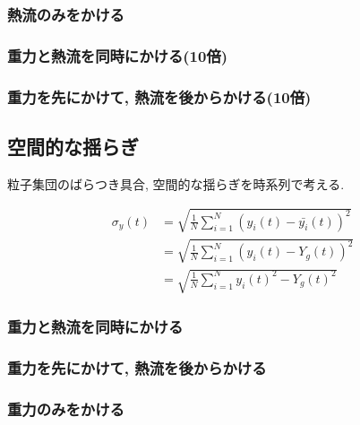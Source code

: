 

\subsubsection{熱流のみをかける}



\subsubsection{重力と熱流を同時にかける(10倍)}

\subsubsection{重力を先にかけて, 熱流を後からかける(10倍)}



\subsection{空間的な揺らぎ}

粒子集団のばらつき具合, 空間的な揺らぎを時系列で考える.

\begin{align}
  \sigma_{y} (t)
  &= \sqrt{\frac{1}{N} \sum_{i=1}^{N} (y_i (t) - \bar{y_i}(t) )^2} \\
  &= \sqrt{\frac{1}{N} \sum_{i=1}^{N} (y_i (t) - Y_g (t) )^2} \\
  &= \sqrt{\frac{1}{N} \sum_{i=1}^{N} {{y_i} (t)}^2 - {{Y_g} (t)}^2}
\end{align}

\subsubsection{重力と熱流を同時にかける}



\subsubsection{重力を先にかけて, 熱流を後からかける}



\subsubsection{重力のみをかける}


